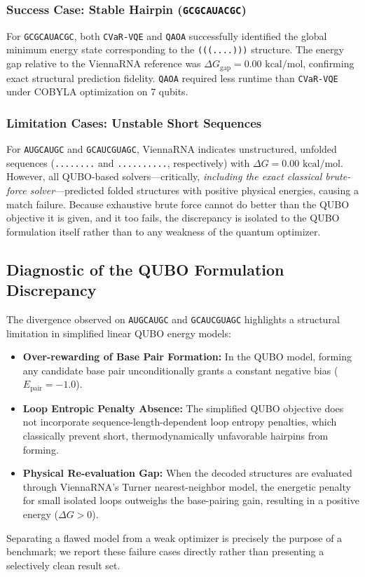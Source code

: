 \documentclass[11pt,a4paper]{article}
\begin{document}
	\subsubsection{Success Case: Stable Hairpin (\texttt{GCGCAUACGC})}
	For \texttt{GCGCAUACGC}, both \texttt{CVaR-VQE} and \texttt{QAOA} successfully identified the global minimum energy state corresponding to the \texttt{(((....)))} structure. The energy gap relative to the ViennaRNA reference was $\Delta G_{\text{gap}} = 0.00\text{ kcal/mol}$, confirming exact structural prediction fidelity. \texttt{QAOA} required less runtime than \texttt{CVaR-VQE} under COBYLA optimization on 7 qubits.
	
	\subsubsection{Limitation Cases: Unstable Short Sequences}
	For \texttt{AUGCAUGC} and \texttt{GCAUCGUAGC}, ViennaRNA indicates unstructured, unfolded sequences (\texttt{........} and \texttt{..........}, respectively) with $\Delta G = 0.00\text{ kcal/mol}$. However, all QUBO-based solvers---critically, \emph{including the exact classical brute-force solver}---predicted folded structures with positive physical energies, causing a match failure. Because exhaustive brute force cannot do better than the QUBO objective it is given, and it too fails, the discrepancy is isolated to the QUBO formulation itself rather than to any weakness of the quantum optimizer.
	
	\subsection{Diagnostic of the QUBO Formulation Discrepancy}
	
	The divergence observed on \texttt{AUGCAUGC} and \texttt{GCAUCGUAGC} highlights a structural limitation in simplified linear QUBO energy models:
	\begin{itemize}[leftmargin=1.2cm]
		\item \textbf{Over-rewarding of Base Pair Formation:} In the QUBO model, forming any candidate base pair unconditionally grants a constant negative bias ($E_{\text{pair}} = -1.0$).
		\item \textbf{Loop Entropic Penalty Absence:} The simplified QUBO objective does not incorporate sequence-length-dependent loop entropy penalties, which classically prevent short, thermodynamically unfavorable hairpins from forming.
		\item \textbf{Physical Re-evaluation Gap:} When the decoded structures are evaluated through ViennaRNA's Turner nearest-neighbor model, the energetic penalty for small isolated loops outweighs the base-pairing gain, resulting in a positive energy ($\Delta G > 0$).
	\end{itemize}
	Separating a flawed model from a weak optimizer is precisely the purpose of a benchmark; we report these failure cases directly rather than presenting a selectively clean result set.
	
\end{document}

